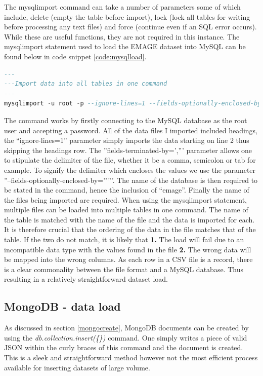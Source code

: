The mysqlimport command can take a number of parameters some of which include, delete (empty the table before import), lock (lock all tables for writing before processing any text files) and force (continue even if an SQL error occurs). While these are useful functions, they are not required in this instance. The mysqlimport statement used to load the EMAGE dataset into MySQL can be found below in code snippet \ref{code:mysqlload}.
\begin{lstlisting}[language=SQL, caption=Command used to load data into the MySQL database., label=code:mysqlload]
---
---Import data into all tables in one command
---
mysqlimport -u root -p --ignore-lines=1 --fields-optionally-enclosed-by='"' --fields-terminated-by=',' emage assays.csv publications.csv sources.csv specimens.csv stages.csv textannotations.csv genes.csv anatomystructures.csv
\end{lstlisting}
\parindent 0pt
The command works by firstly connecting to the MySQL database as the root user and accepting a password. All of the data files I imported included headings, the ``ignore-lines=1'' parameter simply imports the data starting on line 2 thus skipping the headings row. The ''fields-terminated-by=',''' parameter allows one to stipulate the delimiter of the file, whether it be a comma, semicolon or tab for example. To signify the delimiter which encloses the values we use the parameter ''--fields-optionally-enclosed-by='"'''. The name of the database is then required to be stated in the command, hence the inclusion of ``emage''. Finally the name of the files being imported are required. When using the mysqlimport statement, multiple files can be loaded into multiple tables in one command. The name of the table is matched with the name of the file and the data is imported for each. It is therefore crucial that the ordering of the data in the file matches that of the table. If the two do not match, it is likely that \textbf{1.} The load will fail due to an incompatible data type with the values found in the file \textbf{2.} The wrong data will be mapped into the wrong columns. As each row in a CSV file is a record, there is a clear commonality between the file format and a MySQL database. Thus resulting in a relatively straightforward dataset load.
\parindent 15pt

\subsection{MongoDB - data load}\label{mongoload}
As discussed in section \ref{mongocreate}, MongoDB documents can be created by using the \textit{db.collection.insert(\{\})} command. One simply writes a piece of valid JSON within the curly braces of this command and the document is created. This is a sleek and straightforward method however not the most efficient process available for inserting datasets of large volume.


